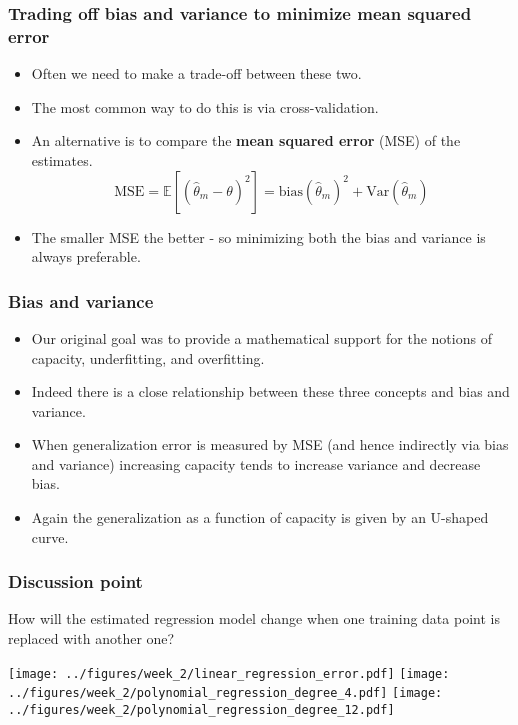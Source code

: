 \documentclass[notes]{beamer}          %
\newcommand{\field}[1]{\mathbb{#1}}
\begin{document}
\begin{frame}
\frametitle{Trading off bias and variance to minimize  mean squared error}
    \begin{itemize}
        \item Often we need to make a trade-off between these two.
        \item The most common way to do this is via cross-validation.
        \item An alternative is to compare the {\bf mean squared error} (MSE) of the estimates.
        $$
        \mbox{MSE} = \field{E}[(\hat{\theta}_m -  \theta)^2] = \mbox{bias}(\hat{\theta}_m)^2 + \mbox{Var}(\hat{\theta}_m)
        $$
        \item The smaller MSE the better - so minimizing both the bias and variance is always preferable.

    \end{itemize}
\end{frame}


\begin{frame}
\frametitle{Bias and variance}
    \begin{itemize}
        \item Our original goal was to provide a mathematical support for the notions of capacity, underfitting, and overfitting.
        \item Indeed there is a close relationship between these three concepts and bias and variance.
        \item When generalization error is measured by MSE (and hence indirectly via bias and variance) increasing capacity tends to increase variance and decrease bias.
        \item Again the generalization as a function of capacity is given by an U-shaped curve.
    \end{itemize}
\end{frame}

\begin{frame}
\frametitle{Discussion point}
How will the estimated regression model change when one training data point is replaced with another one?
\vfill
  \begin{center}
        \texttt{[image: ../figures/week\_2/linear\_regression\_error.pdf]}
        \texttt{[image: ../figures/week\_2/polynomial\_regression\_degree\_4.pdf]}
        \texttt{[image: ../figures/week\_2/polynomial\_regression\_degree\_12.pdf]}
    \end{center}
  
\end{frame}
\end{document}
